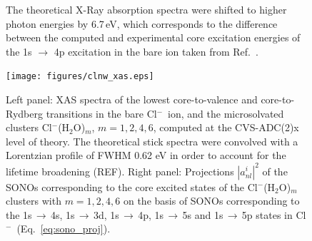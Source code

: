 \documentclass[journal=jacsat,manuscript=suppinfo]{achemso}
\newcommand{\cli}{Cl$^{-}$}
\begin{document}
\begin{figure}
{The theoretical X-Ray absorption spectra were shifted to higher photon energies by 6.7\,eV, which corresponds to the difference between the computed and experimental core excitation energies of the 1s $\rightarrow$ 4p excitation in the bare ion taken from Ref.\ \citep{hertlein06:062715}.}
\label{fg:knw_xas}
\end{figure}


\begin{figure}
\centering
\texttt{[image: figures/clnw\_xas.eps]}
\caption{Left panel: XAS spectra of the lowest core-to-valence and core-to-Rydberg transitions in the bare \cli~ion, and the microsolvated clusters \cli(H$_2$O)$_m$, $m = 1, 2, 4, 6$, computed at the CVS-ADC(2)x level of theory. The theoretical stick spectra were convolved with a Lorentzian profile of FWHM 0.62 eV in order to account for the lifetime broadening (REF). Right panel: Projections $|a_{nl}^{i}|^2$ of the SONOs corresponding to the core excited states of the \cli(H$_2$O)$_m$ clusters with $m = 1, 2, 4, 6$ on the basis of SONOs corresponding to the 1s$\,\rightarrow\,$4s, 1s$\,\rightarrow\,$3d, 1s$\,\rightarrow\,$4p, 1s$\,\rightarrow\,$5s and 1s$\,\rightarrow\,$5p states in \cli~(Eq.\ \ref{eq:sono_proj}).}
\label{fg:clnw_xas}
\end{figure}
\end{document}
